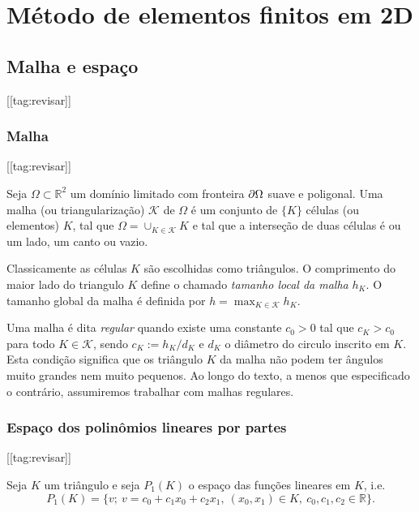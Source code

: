 
\chapter{Método de elementos finitos em 2D}\label{cap_mef2d}
\thispagestyle{fancy}

\section{Malha e espaço}\label{cap_mef2d_sec_malha}
[[tag:revisar]]

\subsection{Malha}
[[tag:revisar]]

Seja $\Omega\subset \mathbb{R}^2$ um domínio limitado com fronteira $\partial\Omega$ suave e poligonal. Uma malha (ou triangularização) $\mathcal{K}$ de $\Omega$ é um conjunto de $\{K\}$ células (ou elementos) $K$, tal que $\Omega = \cup_{K\in\mathcal{K}}K$ e tal que a interseção de duas células é ou um lado, um canto ou vazio.

Classicamente as células $K$ são escolhidas como triângulos. O comprimento do maior lado do triangulo $K$ define o chamado \emph{tamanho local da malha} $h_K$. O tamanho global da malha é definida por $h = \max_{K\in\mathcal{K}} h_K$.

Uma malha é dita \emph{regular} quando existe uma constante $c_0 > 0$ tal que $c_K > c_0$ para todo $K\in\mathcal{K}$, sendo $c_K := h_K/d_K$ e $d_K$ o diâmetro do circulo inscrito em $K$. Esta condição significa que os triângulo $K$ da malha não podem ter ângulos muito grandes nem muito pequenos. Ao longo do texto, a menos que especificado o contrário, assumiremos trabalhar com malhas regulares.

\subsection{Espaço dos polinômios lineares por partes}
[[tag:revisar]]


Seja $K$ um triângulo e seja $P_1(K)$ o espaço das funções lineares em $K$, i.e.
\begin{equation}
  P_1(K) = \{v;~v=c_0+c_1x_0+c_2x_1,~(x_0,x_1)\in K,~c_0,c_1,c_2\in\mathbb{R}\}.
\end{equation}

